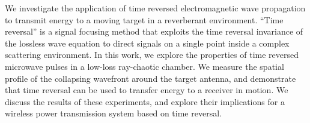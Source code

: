 We investigate the application of time reversed electromagnetic wave propagation
to transmit energy to a moving target in a reverberant environment.
%
``Time reversal'' is a signal focusing method that exploits the time reversal
invariance of the lossless wave equation to direct signals on a single point
inside a complex scattering environment.
%
In this work, we explore the properties of time reversed microwave pulses in a
low-loss ray-chaotic chamber.
%
We measure the spatial profile of the collapsing wavefront around the target
antenna, and demonstrate that time reversal can be used to transfer energy to a
receiver in motion.
%
We discuss the results of these experiments, and explore their implications for
a wireless power transmission system based on time reversal.
